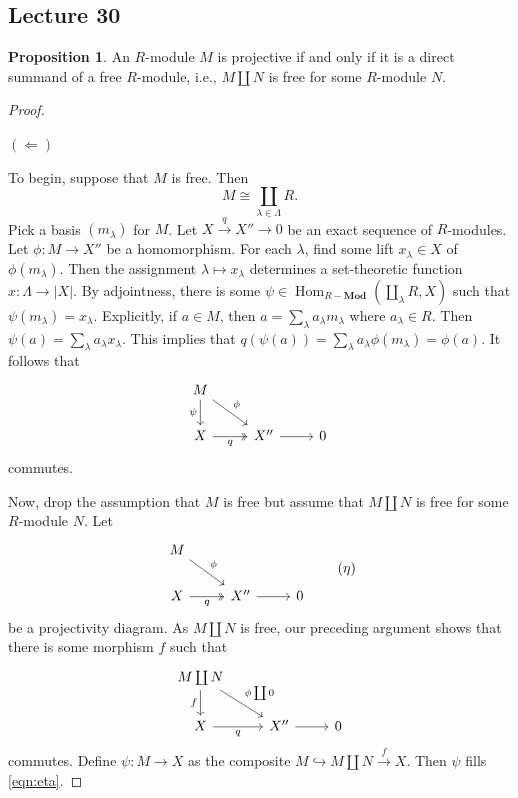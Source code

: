 \documentclass[10pt,letterpaper,cm]{nupset}
\theoremstyle{definition}
\theoremstyle{theorem}
\newtheorem{prop}[definition]{Proposition}
\theoremstyle{remark}
\newcommand{\1}{\mathbf{1}}
\newcommand{\0}{\vec 0}
\DeclareMathOperator{\Hom}{Hom}
\begin{document}
\subsection{Lecture 30}

\begin{prop}
An $R$-module $M$ is projective  if and only if it is a direct summand of a free $R$-module, i.e., $M \coprod N$ is free for some $R$-module $N$.
\end{prop}
\begin{proof} $ $

\smallskip


$(\Longleftarrow)$


To begin, suppose that $M$ is free. Then $$M \cong \coprod_{\lambda \in \Lambda} R.$$  Pick a basis $\left(m_{\lambda}\right)$ for $M$. Let $X \overset{q}{\longrightarrow}  X'' \to 0$ be an exact sequence of $R$-modules. Let $\phi : M \to X''$ be a homomorphism. For each $\lambda$, find some lift $x_{\lambda}\in X$ of $\phi(m_{\lambda})$. Then the assignment $\lambda \mapsto x_{\lambda}$ determines a set-theoretic function $x : \Lambda \to \left\lvert{X}\right\rvert$. By adjointness, there is some $\psi \in \Hom_{R{-}\mathbf{Mod}}\left(\coprod_{\lambda} R, X\right)$ such that $\psi(m_{\lambda}) = x_{\lambda}$. Explicitly, if $a \in M$, then $a = \sum_{\lambda}a_{\lambda}m_{\lambda}$ where $a_{\lambda}\in R$. Then $\psi(a) = \sum_{\lambda} a_{\lambda}x_{\lambda}$. This implies that $q(\psi(a)) = \sum_{\lambda} a_{\lambda}\phi(m_{\lambda}) = \phi(a)$. It follows that \[
\begin{tikzcd}
M \arrow[rd, "\phi"] \arrow[d, "\psi"'] &  &  \\
X \arrow[r, "q"', two heads] & X'' \arrow[r] & 0
\end{tikzcd}
\] commutes.

\medskip

 Now, drop the assumption that $M$ is free but assume that $M \coprod N$ is free for some $R$-module $N$. Let 
\[ \label{eqn:eta}
\begin{tikzcd}
M \arrow[rd, "\phi"] &  &  \\
X \arrow[r, "q"', two heads] & X'' \arrow[r] & 0
\end{tikzcd} \tag{$\eta$}
\] be a projectivity diagram. As $M \coprod N$ is free, our preceding argument shows that there is some morphism $f$ such that
\[\begin{tikzcd}
M\coprod N \arrow[rd, "\phi \coprod 0"] \arrow[d, "f"'] &  &  \\
X \arrow[r, "q"'] & X'' \arrow[r] & 0
\end{tikzcd}
\] commutes. Define $\psi : M \to X$  as the composite $M \hookrightarrow M\coprod N \overset{f}{\longrightarrow} X$. Then $\psi$ fills \eqref{eqn:eta}.


\end{proof}
\end{document}
